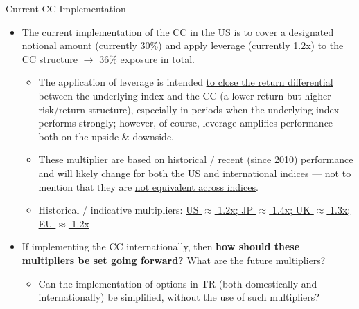 \documentclass{beamer}
\begin{document}
\begin{frame}{Current CC Implementation}

\begin{itemize}
\item The current implementation of the CC in the US is to cover a designated notional amount (currently 30\%) and apply leverage (currently 1.2x) to the CC structure $\rightarrow$ 36\% exposure in total.
	\begin{itemize}
	\vfill
	\item The application of leverage is intended \underline {to close the return differential} between the underlying index and the CC (a lower return but higher risk/return structure), especially in periods when the underlying index performs strongly; however, of course, leverage amplifies performance both on the upside \& downside.
	\vfill
	\item These multiplier are based on historical / recent (since 2010) performance and will likely change for both the US and international indices --- not to mention that they are \underline {not equivalent across indices}. 
	\item Historical / indicative multipliers: \underline {US $\approx$ 1.2x; JP $\approx$ 1.4x; UK $\approx$ 1.3x; EU $\approx$ 1.2x}
	\vfill
	\end{itemize}
\vfill
\item If implementing the CC internationally, then {\bf how should these multipliers be set going forward?} What are the future multipliers?
\begin{itemize}
\item Can the implementation of options in TR (both domestically and internationally) be simplified, without the use of such multipliers?
\end{itemize}
\end{itemize}

\end{frame}
\end{document}
